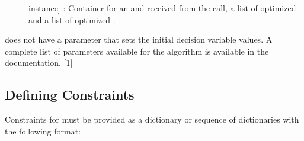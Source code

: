 \documentclass[letterpaper,10pt,english]{sphinxmanual}
\begin{document}
\begin{description}
\item[{}] \leavevmode{[} instance{]}
: Container for an  and  received from
the  call, a list of optimized  and a list of
optimized .

\end{description}

 does not have a parameter that sets the initial decision
variable values. A complete list of parameters available for the
 algorithm is available in the documentation. {[}1{]}


\subsection{Defining Constraints}
\label{\detokenize{doc-src/optimizers:defining-constraints-3}}\label{\detokenize{doc-src/optimizers:defining-constraints-2-1}}
Constraints for  must be provided as a dictionary or sequence of
dictionaries with the following format:

\begin{sphinxVerbatim}[commandchars=\\\{\}]
  \PYG{p}{[}    
                   
                   
                   
                 \PYG{p}{]}
\end{sphinxVerbatim}
\end{document}
